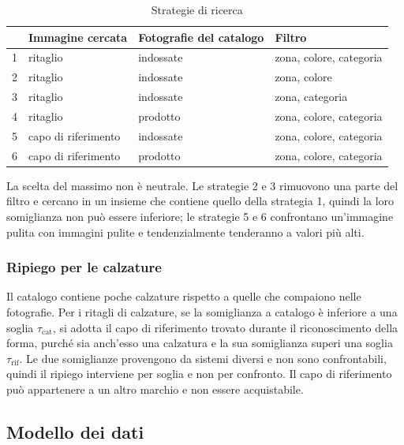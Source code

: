 \begin{table}[htbp]
  \centering
  \small
  \begin{tabular}{clll}
    \hline
    & Immagine cercata & Fotografie del catalogo & Filtro \\
    \hline
    1 & ritaglio      & indossate & zona, colore, categoria \\
    2 & ritaglio      & indossate & zona, colore \\
    3 & ritaglio      & indossate & zona, categoria \\
    4 & ritaglio      & prodotto  & zona, colore, categoria \\
    5 & capo di riferimento & indossate & zona, colore, categoria \\
    6 & capo di riferimento & prodotto  & zona, colore, categoria \\
    \hline
  \end{tabular}
  \caption{Strategie di ricerca}
  \label{tab:pip-strategie}
\end{table}

\noindent
La scelta del massimo non è neutrale. Le strategie 2 e 3 rimuovono una parte del filtro e cercano in un insieme che contiene quello della strategia 1, quindi la loro somiglianza non può essere inferiore; le strategie 5 e 6 confrontano un'immagine pulita con immagini pulite e tendenzialmente tenderanno a valori più alti.

\subsubsection{Ripiego per le calzature}

Il catalogo contiene poche calzature rispetto a quelle che compaiono nelle fotografie. Per i ritagli di calzature, se la somiglianza a catalogo è inferiore a una soglia $\tau_{\mathrm{cat}}$, si adotta il capo di riferimento trovato durante il riconoscimento della forma, purché sia anch'esso una calzatura e la sua somiglianza superi una soglia $\tau_{\mathrm{rif}}$. Le due somiglianze provengono da sistemi diversi e non sono confrontabili, quindi il ripiego interviene per soglia e non per confronto. Il capo di riferimento può
appartenere a un altro marchio e non essere acquistabile.

\newpage

\subsection{Modello dei dati}

